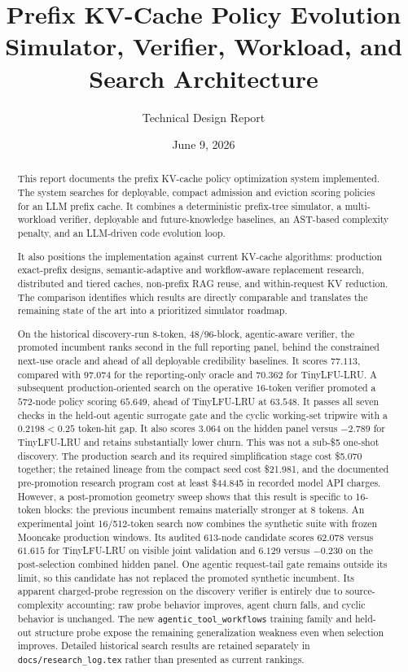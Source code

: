 \documentclass[11pt]{article}
\title{\textbf{\color{navy}Prefix KV-Cache Policy Evolution}\\
\large Simulator, Verifier, Workload, and Search Architecture}
\author{Technical Design Report}
\date{June 9, 2026}
\newcommand{\filepath}[1]{\nolinkurl{#1}}
\newcommand{\identifier}[1]{\nolinkurl{#1}}
\begin{document}
\maketitle

\begin{abstract}
This report documents the prefix KV-cache policy optimization system implemented.
The system searches for deployable,
compact admission and eviction scoring policies for an LLM prefix cache.  It combines
a deterministic prefix-tree simulator, a multi-workload verifier, deployable and
future-knowledge baselines, an AST-based complexity penalty, and an LLM-driven code
evolution loop.

It also positions the implementation against current KV-cache algorithms: production
exact-prefix designs, semantic-adaptive and workflow-aware replacement research,
distributed and tiered caches, non-prefix RAG reuse, and within-request KV reduction.
The comparison identifies which results are directly comparable and translates the
remaining state of the art into a prioritized simulator roadmap.

On the historical discovery-run \(8\)-token, \(48/96\)-block, agentic-aware verifier,
the promoted incumbent ranks second in the full reporting panel, behind the constrained
next-use oracle and ahead of all deployable credibility baselines.  It scores
\(77.113\), compared with \(97.074\) for the reporting-only oracle and \(70.362\) for
TinyLFU-LRU.  A subsequent production-oriented search on the operative \(16\)-token
verifier promoted a \(572\)-node policy scoring \(65.649\), ahead of TinyLFU-LRU at
\(63.548\).  It passes all seven checks in the held-out agentic surrogate gate and the
cyclic working-set tripwire with a \(0.2198<0.25\) token-hit gap.  It also scores
\(3.064\) on the hidden panel versus \(-2.789\) for TinyLFU-LRU and retains
substantially lower churn.
This was not a sub-\$5 one-shot discovery.  The production search and its required
simplification stage cost \$5.070 together; the retained lineage from the compact seed
cost \$21.981, and the documented pre-promotion research program cost at least
\$44.845 in recorded model API charges.
However, a post-promotion geometry sweep shows that this result is specific to
16-token blocks: the previous incumbent remains materially stronger at 8 tokens.
An experimental joint 16/512-token search now combines the synthetic suite with
frozen Mooncake production windows.  Its audited 613-node candidate scores
\(62.078\) versus \(61.615\) for TinyLFU-LRU on visible joint validation and
\(6.129\) versus \(-0.230\) on the post-selection combined hidden panel.  One
agentic request-tail gate remains outside its limit, so this candidate has not
replaced the promoted synthetic incumbent.
Its apparent charged-probe
regression on the discovery verifier is entirely due to source-complexity accounting:
raw probe behavior improves, agent churn falls, and cyclic behavior is unchanged.  The
new
\identifier{agentic_tool_workflows} training family and held-out structure probe expose
the remaining generalization weakness even when selection improves.  Detailed
historical search results are retained separately in
\filepath{docs/research_log.tex} rather than presented as current rankings.


\end{abstract}
\end{document}
